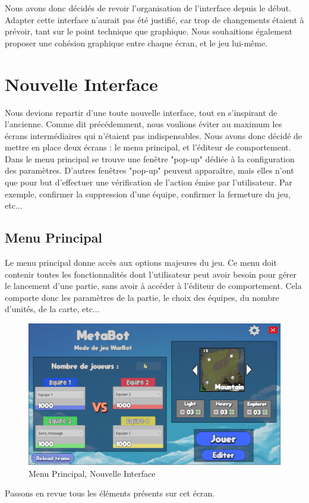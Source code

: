 \documentclass{report}
\begin{document}
Nous avons donc décidés de revoir l'organisation de l'interface depuis le début. Adapter cette interface n'aurait pas été justifié, car trop de changements étaient à prévoir, tant sur le point technique que graphique.\newline
Nous souhaitions également proposer une cohésion graphique entre chaque écran, et le jeu lui-même.


\section{Nouvelle Interface}
Nous devions repartir d'une toute nouvelle interface, tout en s'inspirant de l'ancienne. Comme dit précédemment, nous voulions éviter au maximum les écrans intermédiaires qui n'étaient pas indispensables.
Nous avons donc décidé de mettre en place deux écrans : le menu principal,  et l'éditeur de comportement. Dans le menu principal se trouve une fenêtre "pop-up" dédiée à la configuration des paramètres. D'autres fenêtres "pop-up" peuvent apparaître, mais elles n'ont que pour but d'effectuer une vérification de l'action émise par l'utilisateur. Par exemple, confirmer la suppression d'une équipe, confirmer la fermeture du jeu, etc...

\subsection{Menu Principal}
Le menu principal donne accès aux options majeures du jeu. Ce menu doit contenir toutes les fonctionnalités dont l'utilisateur peut avoir besoin pour gérer le lancement d'une partie, sans avoir à accéder à l'éditeur de comportement.
Cela comporte donc les paramètres de la partie, le choix des équipes, du nombre d'unités, de la carte, etc... \newline
\begin{figure}[!h]
	\centering
		\includegraphics[scale=0.50]{MenuPrincipal}
	\caption{Menu Principal, Nouvelle Interface}
\end{figure}
Passons en revue tous les éléments présents sur cet écran.
\end{document}
